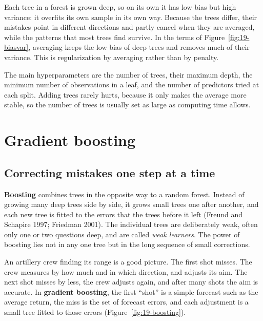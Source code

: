 Each tree in a forest is grown deep, so on its own it has low bias but high variance: it overfits its own sample in its own way. Because the trees differ, their mistakes point in different directions and partly cancel when they are averaged, while the patterns that most trees find survive. In the terms of Figure~\ref{fig:19-biasvar}, averaging keeps the low bias of deep trees and removes much of their variance. This is regularization by averaging rather than by penalty.

The main hyperparameters are the number of trees, their maximum depth, the minimum number of observations in a leaf, and the number of predictors tried at each split. Adding trees rarely hurts, because it only makes the average more stable, so the number of trees is usually set as large as computing time allows.

\section{Gradient boosting}
\label{sec:19-gbm}

\subsection{Correcting mistakes one step at a time}

\textbf{Boosting} combines trees in the opposite way to a random forest. Instead of growing many deep trees side by side, it grows small trees one after another, and each new tree is fitted to the errors that the trees before it left (Freund and Schapire 1997; Friedman 2001). The individual trees are deliberately weak, often only one or two questions deep, and are called \emph{weak learners}. The power of boosting lies not in any one tree but in the long sequence of small corrections.

An artillery crew finding its range is a good picture. The first shot misses. The crew measures by how much and in which direction, and adjusts its aim. The next shot misses by less, the crew adjusts again, and after many shots the aim is accurate. In \textbf{gradient boosting}, the first ``shot'' is a simple forecast such as the average return, the miss is the set of forecast errors, and each adjustment is a small tree fitted to those errors (Figure~\ref{fig:19-boosting}).

